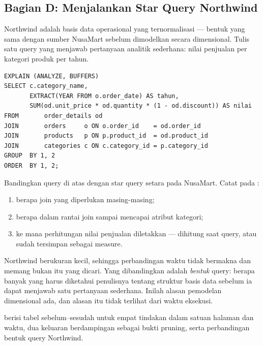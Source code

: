 \subsection{Bagian D: Menjalankan Star Query Northwind}


Northwind adalah basis data operasional yang ternormalisasi --- bentuk yang
sama dengan sumber NusaMart sebelum dimodelkan secara dimensional. Tulis satu
query yang menjawab pertanyaan analitik sederhana: nilai penjualan per kategori
produk per tahun.

\begin{lstlisting}[style=sqlgaya]
EXPLAIN (ANALYZE, BUFFERS)
SELECT c.category_name,
       EXTRACT(YEAR FROM o.order_date) AS tahun,
       SUM(od.unit_price * od.quantity * (1 - od.discount)) AS nilai
FROM       order_details od
JOIN       orders     o ON o.order_id    = od.order_id
JOIN       products   p ON p.product_id  = od.product_id
JOIN       categories c ON c.category_id = p.category_id
GROUP  BY 1, 2
ORDER  BY 1, 2;
\end{lstlisting}


Bandingkan query di atas dengan star query setara pada NusaMart. Catat pada
:

\begin{enumerate}[leftmargin=1.4em]
  \item berapa join yang diperlukan masing-masing;
  \item berapa dalam rantai join sampai mencapai atribut kategori;
  \item ke mana perhitungan nilai penjualan diletakkan --- dihitung saat query,
        atau sudah tersimpan sebagai measure.
\end{enumerate}

\begin{catatan}
Northwind berukuran kecil, sehingga perbandingan waktu tidak bermakna dan
memang bukan itu yang dicari. Yang dibandingkan adalah \emph{bentuk} query:
berapa banyak yang harus diketahui penulisnya tentang struktur basis data
sebelum ia dapat menjawab satu pertanyaan sederhana. Inilah alasan pemodelan
dimensional ada, dan alasan itu tidak terlihat dari waktu eksekusi.
\end{catatan}

\begin{luaran}
 berisi tabel
sebelum--sesudah untuk empat tindakan dalam satuan halaman dan waktu, dua
keluaran  berdampingan sebagai bukti pruning, serta
perbandingan bentuk query Northwind.
\end{luaran}

